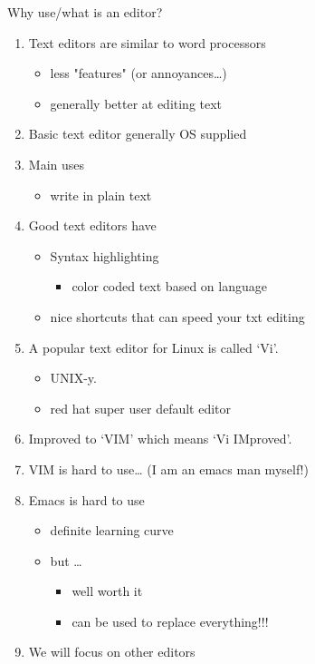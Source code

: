 \documentclass[t,10pt]{beamer}
\begin{document}
\begin{frame}[label={sec:orgheadline6}]{Why use/what is an editor?}
\begin{enumerate}[<+->]
\item Text editors are similar to word processors 
\begin{itemize}
\item less "features" (or annoyances\ldots{})
\item generally better at editing text
\end{itemize}
\item Basic text editor generally OS supplied
\item Main uses
\begin{itemize}
\item write in plain text
\end{itemize}
\item Good text editors have
\begin{itemize}
\item Syntax highlighting
\begin{itemize}
\item color coded text based on language
\end{itemize}
\item nice shortcuts that can speed your txt editing
\end{itemize}
\item A popular text editor for Linux is called ‘Vi’. 
\begin{itemize}
\item UNIX-y.
\item red hat super user default editor
\end{itemize}
\item Improved to ‘VIM’ which means ‘Vi IMproved’.
\item VIM is hard to use\ldots{} (I am an emacs man myself!)
\item Emacs is hard to use
\begin{itemize}
\item definite learning curve
\item but \ldots{}
\begin{itemize}
\item well worth it
\item can be used to replace everything!!!
\end{itemize}
\end{itemize}
\item We will focus on other editors
\end{enumerate}
\end{frame}
\end{document}
